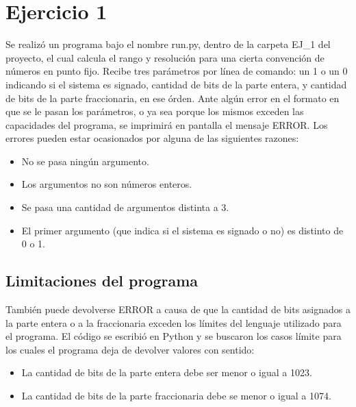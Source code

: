 \section{Ejercicio 1}
Se realizó un programa bajo el nombre run.py, dentro de la carpeta EJ\_1 del proyecto, el cual calcula el rango y resolución para una cierta convención de números en punto fijo.
Recibe tres parámetros por línea de comando: un 1 o un 0 indicando si el sistema es signado, cantidad de bits de la parte entera, y cantidad de bits de la parte fraccionaria, en ese órden.
Ante algún error en el formato en que se le pasan los parámetros, o ya sea porque los mismos exceden las capacidades del programa, se imprimirá en pantalla el mensaje ERROR.
Los errores pueden estar ocasionados por alguna de las siguientes razones:
\begin{itemize}
    \item No se pasa ningún argumento.
    \item Los argumentos no son números enteros.
    \item Se pasa una cantidad de argumentos distinta a 3.
    \item El primer argumento (que indica si el sistema es signado o no) es distinto de 0 o 1.
\end{itemize}


\subsection{Limitaciones del programa}
También puede devolverse ERROR a causa de que la cantidad de bits asignados a la parte entera o a la fraccionaria exceden los límites del lenguaje utilizado para el programa.
El código se escribió en Python y se buscaron los casos límite para los cuales el programa deja de devolver valores con sentido:
\begin{itemize}
    \item La cantidad de bits de la parte entera debe ser menor o igual a 1023.
    \item La cantidad de bits de la parte fraccionaria debe se menor o igual a 1074.
\end{itemize}

